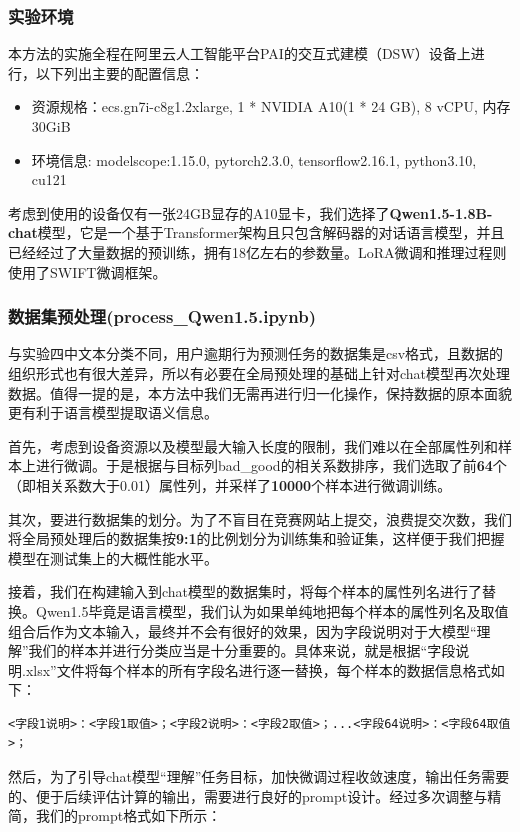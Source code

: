 \documentclass[UTF8]{article}
\begin{document}
\subsubsection{实验环境}
本方法的实施全程在阿里云人工智能平台PAI的交互式建模（DSW）设备上进行，以下列出主要的配置信息：
\begin{itemize}
	\item 资源规格：ecs.gn7i-c8g1.2xlarge, 1 * NVIDIA A10(1 * 24 GB), 8 vCPU, 内存30GiB
	\item 环境信息: modelscope:1.15.0, pytorch2.3.0, tensorflow2.16.1, python3.10, cu121
\end{itemize}

\indent 考虑到使用的设备仅有一张24GB显存的A10显卡，我们选择了\textbf{Qwen1.5-1.8B-chat}模型，它是一个基于Transformer架构且只包含解码器的对话语言模型，并且已经经过了大量数据的预训练，拥有18亿左右的参数量。LoRA微调和推理过程则使用了SWIFT微调框架。

\subsubsection{数据集预处理(process\_Qwen1.5.ipynb)}
与实验四中文本分类不同，用户逾期行为预测任务的数据集是csv格式，且数据的组织形式也有很大差异，所以有必要在全局预处理的基础上针对chat模型再次处理数据。值得一提的是，本方法中我们无需再进行归一化操作，保持数据的原本面貌更有利于语言模型提取语义信息。

首先，考虑到设备资源以及模型最大输入长度的限制，我们难以在全部属性列和样本上进行微调。于是根据与目标列bad\_good的相关系数排序，我们选取了前\textbf{64}个（即相关系数大于0.01）属性列，并采样了\textbf{10000}个样本进行微调训练。

其次，要进行数据集的划分。为了不盲目在竞赛网站上提交，浪费提交次数，我们将全局预处理后的数据集按\textbf{9:1}的比例划分为训练集和验证集，这样便于我们把握模型在测试集上的大概性能水平。

接着，我们在构建输入到chat模型的数据集时，将每个样本的属性列名进行了替换。Qwen1.5毕竟是语言模型，我们认为如果单纯地把每个样本的属性列名及取值组合后作为文本输入，最终并不会有很好的效果，因为字段说明对于大模型“理解”我们的样本并进行分类应当是十分重要的。具体来说，就是根据“字段说明.xlsx”文件将每个样本的所有字段名进行逐一替换，每个样本的数据信息格式如下：

\begin{lstlisting}
<字段1说明>：<字段1取值>；<字段2说明>：<字段2取值>；...<字段64说明>：<字段64取值>；
\end{lstlisting}

然后，为了引导chat模型“理解”任务目标，加快微调过程收敛速度，输出任务需要的、便于后续评估计算的输出，需要进行良好的prompt设计。经过多次调整与精简，我们的prompt格式如下所示：
\end{document}
